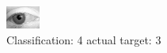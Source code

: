 \begin{figure}[h!]
\begin{center}
\includegraphics[width=0.60\columnwidth]{figures/ID2852_class_4_target_3.png}
\end{center}
\caption{ Classification: 4 actual target: 3}
\label{fig:ID2852_class_4_target_3}
\end{figure}
